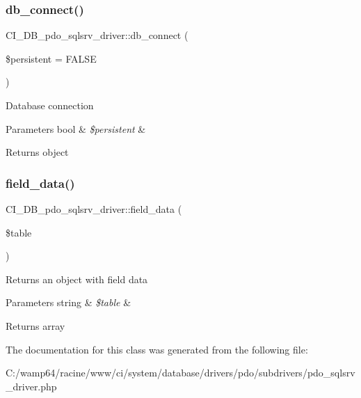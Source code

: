 \subsubsection{\texorpdfstring{db\+\_\+connect()}{db\_connect()}}
{\footnotesize\ttfamily C\+I\+\_\+\+D\+B\+\_\+pdo\+\_\+sqlsrv\+\_\+driver\+::db\+\_\+connect (\begin{DoxyParamCaption}\item[{}]{\$persistent = {\ttfamily FALSE} }\end{DoxyParamCaption})}

Database connection


\begin{DoxyParams}[1]{Parameters}
bool & {\em \$persistent} & \\
\hline
\end{DoxyParams}
\begin{DoxyReturn}{Returns}
object 
\end{DoxyReturn}
\mbox{\label{class_c_i___d_b__pdo__sqlsrv__driver_add6a47c257555ecf61c5c0f3f6003874}} 
\subsubsection{\texorpdfstring{field\+\_\+data()}{field\_data()}}
{\footnotesize\ttfamily C\+I\+\_\+\+D\+B\+\_\+pdo\+\_\+sqlsrv\+\_\+driver\+::field\+\_\+data (\begin{DoxyParamCaption}\item[{}]{\$table }\end{DoxyParamCaption})}

Returns an object with field data


\begin{DoxyParams}[1]{Parameters}
string & {\em \$table} & \\
\hline
\end{DoxyParams}
\begin{DoxyReturn}{Returns}
array 
\end{DoxyReturn}


The documentation for this class was generated from the following file\+:\begin{DoxyCompactItemize}
\item 
C\+:/wamp64/racine/www/ci/system/database/drivers/pdo/subdrivers/pdo\+\_\+sqlsrv\+\_\+driver.\+php\end{DoxyCompactItemize}
